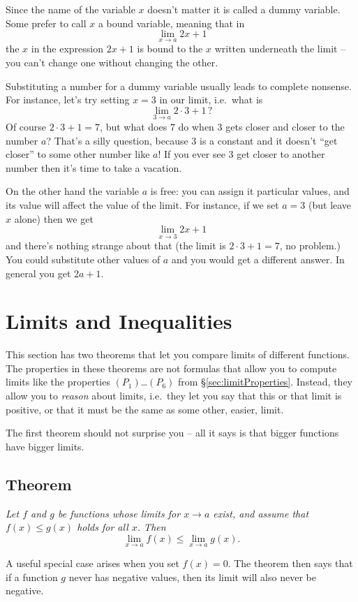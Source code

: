 Since the name of the variable $x$ doesn't matter it is called a dummy
variable.  Some prefer to call $x$ a bound variable, meaning that in
\[
\lim_{x\to a} 2x+1
\]
the $x$ in the expression $2x+1$ is bound to the $x$ written underneath the
limit -- you can't change one without changing the other.

Substituting a number for a dummy variable usually leads to complete
nonsense.  For instance, let's try setting $x=3$ in our limit, i.e.\ what
is
\[
\lim_{3\to a}2\cdot 3+1\,?
\]
Of course $2\cdot 3+1 = 7$, but what does $7$ do when $3$ gets closer and
closer to the number $a$?  That's a silly question, because 3 is a constant
and it doesn't ``get closer'' to some other number like $a$!  If you ever
see 3 get closer to another number then it's time to take a vacation.

On the other hand the variable $a$ is free: you can assign it particular
values, and its value will affect the value of the limit.  For instance, if
we set $a=3$ (but leave $x$ alone) then we get
\[
\lim_{x\to 3} 2x+1
\]
and there's nothing strange about that (the limit is $2\cdot3+1=7$, no
problem.)  You could substitute other values of $a$ and you would get a
different answer.  In general you get $2a+1$.

\section{Limits and Inequalities}
\label{sec:limits-and-inequalities}%
This section has two theorems that let you compare limits of different
functions.  The properties in these theorems are not formulas that
allow you to compute limits like the properties $(P_1)$\ldots$(P_6)$
from \S\ref{sec:limitProperties}.  Instead, they allow you to
\emph{reason} about limits, i.e.\ they let you say that this or that
limit is positive, or that it must be the same as some other, easier,
limit.

The first theorem should not surprise you -- all it says is that bigger
functions have bigger limits.

\subsection{Theorem}
\itshape
Let $f$ and $g$ be functions whose limits for $x\to a$ exist, and assume
that $f(x)\leq g(x)$ holds for all $x$.  Then
\[
\lim_{x\to a}f(x) \leq \lim_{x\to a} g(x).
\]
\upshape

A useful special case arises when you set $f(x)=0$.  The theorem then says
that if a function $g$ never has negative values, then its limit will also
never be negative.

